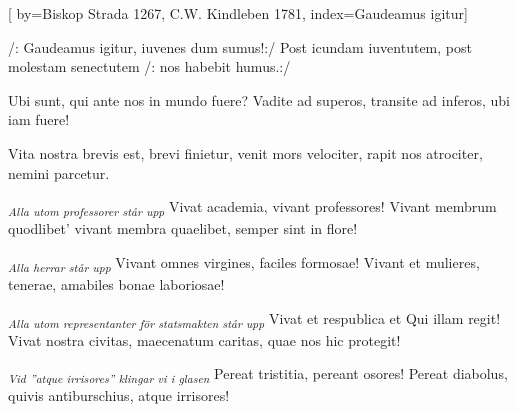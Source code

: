 [
by={Biskop Strada 1267, C.W. Kindleben 1781},
index={Gaudeamus igitur}]

\beginverse*
/: Gaudeamus igitur,
iuvenes dum sumus!:/
Post icundam iuventutem,
post molestam senectutem
/: nos habebit humus.:/
\endverse	

\beginverse*
Ubi sunt, qui ante nos
in mundo fuere?
Vadite ad superos,
transite ad inferos,
ubi iam fuere!
\endverse	

\beginverse*
Vita nostra brevis est,
brevi finietur,
venit mors velociter,
rapit nos atrociter,
nemini parcetur.
\endverse	

\beginverse*
\textsubscript{\textit{\tiny{Alla utom professorer står upp}}}
Vivat academia,
vivant professores!
Vivant membrum quodlibet'
vivant membra quaelibet,
semper sint in flore!
\endverse	

\beginverse*
\textsubscript{\textit{\tiny{Alla herrar står upp}}}
Vivant omnes virgines,
faciles formosae!
Vivant et mulieres,
tenerae, amabiles
bonae laboriosae!
\endverse	

\beginverse*
\textsubscript{\textit{\tiny{Alla utom representanter för statsmakten står upp}}}
Vivat et respublica
et Qui illam regit!
Vivat nostra civitas,
maecenatum caritas,
quae nos hic protegit!
\endverse	

\beginverse*
\textsubscript{\textit{\tiny{Vid ''atque irrisores'' klingar vi i glasen}}}
Pereat tristitia,
pereant osores!
Pereat diabolus,
quivis antiburschius,
atque irrisores!
\endverse	

\vspace{1cm}

\endsong


